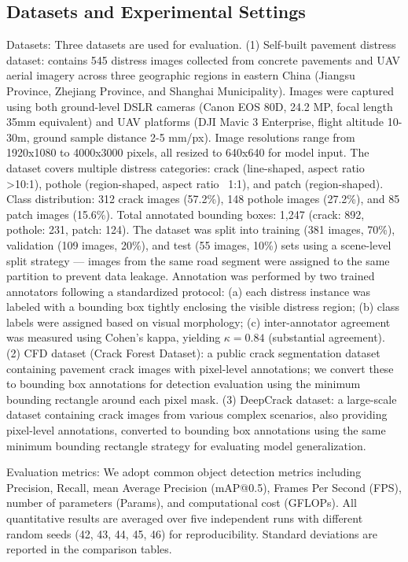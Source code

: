 \documentclass[twocolumn]{sn-jnl}
\begin{document}
	\subsection{Datasets and Experimental Settings}
	Datasets: Three datasets are used for evaluation. (1) Self-built pavement distress dataset: contains 545 distress images collected from concrete pavements and UAV aerial imagery across three geographic regions in eastern China (Jiangsu Province, Zhejiang Province, and Shanghai Municipality). Images were captured using both ground-level DSLR cameras (Canon EOS 80D, 24.2 MP, focal length 35mm equivalent) and UAV platforms (DJI Mavic 3 Enterprise, flight altitude 10-30m, ground sample distance 2-5 mm/px). Image resolutions range from 1920x1080 to 4000x3000 pixels, all resized to 640x640 for model input. The dataset covers multiple distress categories: crack (line-shaped, aspect ratio >10:1), pothole (region-shaped, aspect ratio ~1:1), and patch (region-shaped). Class distribution: 312 crack images (57.2\%), 148 pothole images (27.2\%), and 85 patch images (15.6\%). Total annotated bounding boxes: 1,247 (crack: 892, pothole: 231, patch: 124). The dataset was split into training (381 images, 70\%), validation (109 images, 20\%), and test (55 images, 10\%) sets using a scene-level split strategy --- images from the same road segment were assigned to the same partition to prevent data leakage. Annotation was performed by two trained annotators following a standardized protocol: (a) each distress instance was labeled with a bounding box tightly enclosing the visible distress region; (b) class labels were assigned based on visual morphology; (c) inter-annotator agreement was measured using Cohen's kappa, yielding $\kappa = 0.84$ (substantial agreement). (2) CFD dataset (Crack Forest Dataset): a public crack segmentation dataset containing pavement crack images with pixel-level annotations; we convert these to bounding box annotations for detection evaluation using the minimum bounding rectangle around each pixel mask. (3) DeepCrack dataset: a large-scale dataset containing crack images from various complex scenarios, also providing pixel-level annotations, converted to bounding box annotations using the same minimum bounding rectangle strategy for evaluating model generalization.
	
	Evaluation metrics: We adopt common object detection metrics including Precision, Recall, mean Average Precision (mAP@0.5), Frames Per Second (FPS), number of parameters (Params), and computational cost (GFLOPs). All quantitative results are averaged over five independent runs with different random seeds (42, 43, 44, 45, 46) for reproducibility. Standard deviations are reported in the comparison tables.
	
\end{document}
